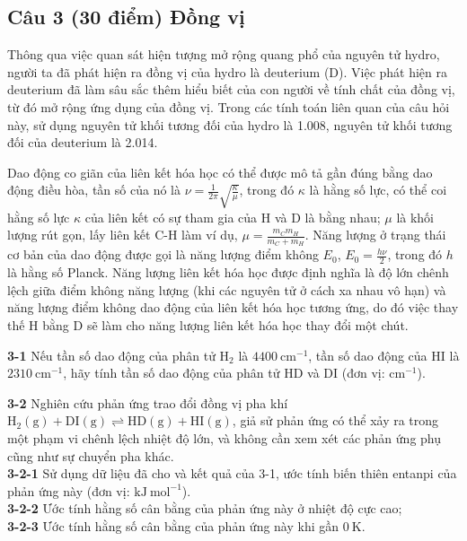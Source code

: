 \vspace{0.5cm}

\subsection{Câu 3 (30 điểm) Đồng vị}

Thông qua việc quan sát hiện tượng mở rộng quang phổ của nguyên tử hydro, người ta đã phát hiện ra đồng vị của hydro là deuterium (D). Việc phát hiện ra deuterium đã làm sâu sắc thêm hiểu biết của con người về tính chất của đồng vị, từ đó mở rộng ứng dụng của đồng vị. Trong các tính toán liên quan của câu hỏi này, sử dụng nguyên tử khối tương đối của hydro là 1.008, nguyên tử khối tương đối của deuterium là 2.014.

Dao động co giãn của liên kết hóa học có thể được mô tả gần đúng bằng dao động điều hòa, tần số của nó là $\nu = \frac{1}{2\pi}\sqrt{\frac{\kappa}{\mu}}$, trong đó $\kappa$ là hằng số lực, có thể coi hằng số lực $\kappa$ của liên kết có sự tham gia của $\mathrm{H}$ và $\mathrm{D}$ là bằng nhau; $\mu$ là khối lượng rút gọn, lấy liên kết C-H làm ví dụ, $\mu = \frac{m_C m_H}{m_C + m_H}$. Năng lượng ở trạng thái cơ bản của dao động được gọi là năng lượng điểm không $E_0$, $E_0 = \frac{h\nu}{2}$, trong đó $h$ là hằng số Planck. Năng lượng liên kết hóa học được định nghĩa là độ lớn chênh lệch giữa điểm không năng lượng (khi các nguyên tử ở cách xa nhau vô hạn) và năng lượng điểm không dao động của liên kết hóa học tương ứng, do đó việc thay thế $\mathrm{H}$ bằng $\mathrm{D}$ sẽ làm cho năng lượng liên kết hóa học thay đổi một chút.

\vspace{0.2cm}

\noindent
\textbf{3-1} Nếu tần số dao động của phân tử $\mathrm{H_2}$ là $4400\ \mathrm{cm^{-1}}$, tần số dao động của $\mathrm{HI}$ là $2310\ \mathrm{cm^{-1}}$, hãy tính tần số dao động của phân tử $\mathrm{HD}$ và $\mathrm{DI}$ (đơn vị: $\mathrm{cm^{-1}}$).

\vspace{0.2cm}

\noindent
\textbf{3-2} Nghiên cứu phản ứng trao đổi đồng vị pha khí $\mathrm{H_2(g) + DI(g) \rightleftharpoons HD(g) + HI(g)}$, giả sử phản ứng có thể xảy ra trong một phạm vi chênh lệch nhiệt độ lớn, và không cần xem xét các phản ứng phụ cũng như sự chuyển pha khác. \\
\textbf{3-2-1} Sử dụng dữ liệu đã cho và kết quả của 3-1, ước tính biến thiên entanpi của phản ứng này (đơn vị: $\mathrm{kJ\ mol^{-1}}$). \\
\textbf{3-2-2} Ước tính hằng số cân bằng của phản ứng này ở nhiệt độ cực cao; \\
\textbf{3-2-3} Ước tính hằng số cân bằng của phản ứng này khi gần $0\ \mathrm{K}$.


